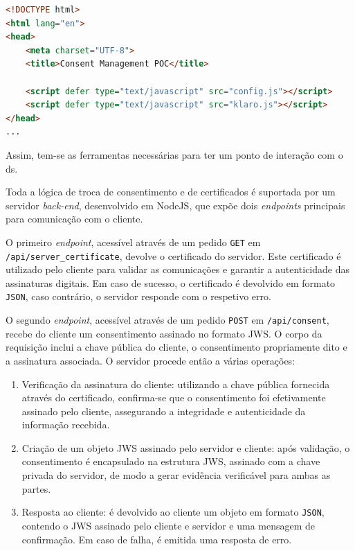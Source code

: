 \begin{lstlisting}[language=HTML, caption={Integração do \textit{klaro.js} com a configuração local}, label={lst:klaro-integration}]
<!DOCTYPE html>
<html lang="en">
<head>
    <meta charset="UTF-8">
    <title>Consent Management POC</title>

    <script defer type="text/javascript" src="config.js"></script>
    <script defer type="text/javascript" src="klaro.js"></script>
</head>
...
\end{lstlisting}

Assim, tem-se as ferramentas necessárias para ter um ponto de interação com o \acrshort{ds}.

Toda a lógica de troca de consentimento e de certificados é suportada por um servidor \textit{back-end}, desenvolvido em NodeJS, que expõe dois \textit{endpoints} principais para comunicação com o cliente.

O primeiro \textit{endpoint}, acessível através de um pedido \texttt{GET} em \texttt{/api/server\_certificate}, devolve o certificado do servidor. Este certificado é utilizado pelo cliente para validar as comunicações e garantir a autenticidade das assinaturas digitais. Em caso de sucesso, o certificado é devolvido em formato \texttt{JSON}, caso contrário, o servidor responde com o respetivo erro.

O segundo \textit{endpoint}, acessível através de um pedido \texttt{POST} em \texttt{/api/consent}, recebe do cliente um consentimento assinado no formato JWS. O corpo da requisição inclui a chave pública do cliente, o consentimento propriamente dito e a assinatura associada. O servidor procede então a várias operações:

\begin{enumerate}
    \item Verificação da assinatura do cliente: utilizando a chave pública fornecida através do certificado, confirma-se que o consentimento foi efetivamente assinado pelo cliente, assegurando a integridade e autenticidade da informação recebida.
    \item Criação de um objeto JWS assinado pelo servidor e cliente: após validação, o consentimento é encapsulado na estrutura JWS, assinado com a chave privada do servidor, de modo a gerar evidência verificável para ambas as partes.
    \item Resposta ao cliente: é devolvido ao cliente um objeto em formato \texttt{JSON}, contendo o JWS assinado pelo cliente e servidor e uma mensagem de confirmação. Em caso de falha, é emitida uma resposta de erro.
\end{enumerate}

